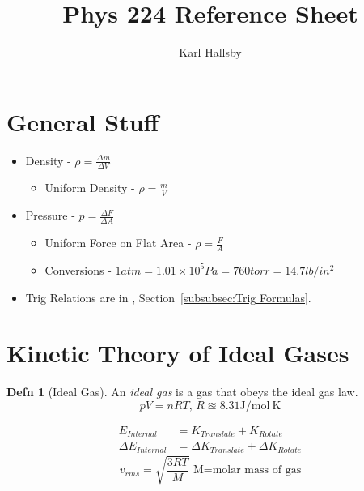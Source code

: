 \documentclass[10pt,letterpaper,final,twoside,notitlepage]{article}
\author{Karl Hallsby}
\title{Phys 224 Reference Sheet}
\numberwithin{equation}{section} %
\theoremstyle{definition}
\newtheorem{definition}{Defn} %
\theoremstyle{remark}
\begin{document}
\section{General Stuff} \label{sec:General}
	\begin{itemize}[noitemsep]
		\item Density - $\rho = \frac{\Delta m}{\Delta V}$
			\begin{itemize}
				\item Uniform Density - $\rho = \frac{m}{V}$
			\end{itemize}
		
		\item Pressure - $p = \frac{\Delta F}{\Delta A}$
			\begin{itemize}
				\item Uniform Force on Flat Area - $\rho = \frac{F}{A}$
				\item Conversions - $1 atm = 1.01 \times 10^5 Pa = 760 torr = 14.7 lb/in^2$
			\end{itemize}
		\item Trig Relations are in , Section~\ref{subsubsec:Trig Formulas}.
	\end{itemize}





\section{Kinetic Theory of Ideal Gases} \label{sec:Kinetic Theory of Ideal Gases}
	\begin{definition}[Ideal Gas] \label{def:Ideal Gas}
		An \emph{ideal gas} is a gas that obeys the ideal gas law.
		\begin{equation} \label{eq:Ideal Gas Law}
			pV = nRT \text{, } R \approxeq 8.31 \si{\joule / \mole~\kelvin}
		\end{equation}
	\end{definition}
	\begin{align} \label{eq:Total Internal Energy of Ideal Gas}
		E_{Internal} &= K_{Translate} + K_{Rotate} \\
		\Delta E_{Internal} &= \Delta K_{Translate} + \Delta K_{Rotate} 
	\end{align}
	\begin{equation} \label{eq:Vrms of Ideal Gas}
		v_{rms} = \sqrt{\frac{3RT}{M}} \text{ M=molar mass of gas}
	\end{equation}
	
\end{document}
